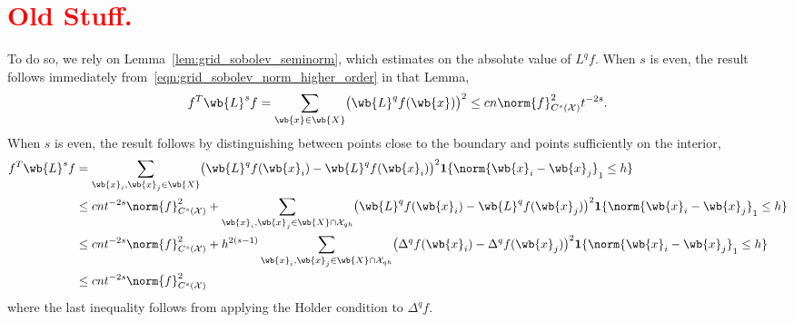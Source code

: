 \documentclass{article}
\newcommand{\1}{\mathbf{1}}
\newcommand{\Xset}{\mathcal{X}}
\theoremstyle{alden}
\theoremstyle{aldenthm}
\theoremstyle{definition}
\theoremstyle{remark}
\begin{document}
\section{\textcolor{red}{Old Stuff.}}
To do so, we rely on Lemma~\ref{lem:grid_sobolev_seminorm}, which estimates on the absolute value of $L^q f$. When $s$ is even, the result follows immediately from~\eqref{eqn:grid_sobolev_norm_higher_order} in that Lemma,
\begin{equation*}
f^T \wb{L}^s f = \sum_{\wb{x} \in \wb{X}} \bigl(\wb{L}^q f(\wb{x})\bigr)^2 \leq c n \norm{f}_{C^s(\Xset)}^2 t^{-2s}.
\end{equation*}
When $s$ is even, the result follows by distinguishing between points close to the boundary and points sufficiently on the interior,
\begin{align*}
f^T \wb{L}^s f  & = \sum_{\wb{x}_i,\wb{x}_j \in \wb{X}} \bigl(\wb{L}^q f(\wb{x}_i) - \wb{L}^q f(\wb{x}_i)\bigr)^2 \1\{\norm{\wb{x}_i - \wb{x}_j}_1 \leq h\} \\
& \leq c n t^{-2s} \norm{f}_{C^s(\Xset)}^2 + \sum_{\wb{x}_i,\wb{x}_j \in \wb{X} \cap \Xset_{qh}} \bigl(\wb{L}^q f(\wb{x}_i) - \wb{L}^q f(\wb{x}_j)\bigr)^2 \1\{\norm{\wb{x}_i - \wb{x}_j}_1 \leq h\} \\
& \leq c n t^{-2s} \norm{f}_{C^s(\Xset)}^2 + h^{2(s - 1)}\sum_{\wb{x}_i,\wb{x}_j \in \wb{X} \cap \Xset_{qh}} \bigl(\Delta^q f(\wb{x}_i) - \Delta^q f(\wb{x}_j)\bigr)^2 \1\{\norm{\wb{x}_i - \wb{x}_j}_1 \leq h\} \\
& \leq c n t^{-2s} \norm{f}_{C^s(\Xset)}^2
\end{align*}
where the last inequality follows from applying the Holder condition to $\Delta^q f$.
\end{document}

